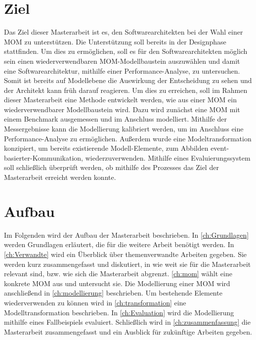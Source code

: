 \section{Ziel}
Das Ziel dieser Masterarbeit ist es, den Softwarearchitekten bei der Wahl einer MOM zu unterstützen. Die Unterstützung soll bereits in der Designphase stattfinden. Um dies zu ermöglichen, soll es für den Softwarearchitekten möglich sein einen wiederverwendbaren MOM-Modellbaustein auszuwählen und damit eine Softwarearchitektur, mithilfe einer Performance-Analyse, zu untersuchen. Somit ist bereits auf Modellebene die Auswirkung der Entscheidung zu sehen und der Architekt kann früh darauf reagieren. Um dies zu erreichen, soll im Rahmen dieser Masterarbeit eine Methode entwickelt werden, wie aus einer MOM ein wiederverwendbarer Modellbaustein wird. Dazu wird zunächst eine MOM mit einem Benchmark ausgemessen und im Anschluss modelliert. Mithilfe der Messergebnisse kann die Modellierung kalibriert werden, um im Anschluss eine Performance-Analyse zu ermöglichen. Außerdem wurde eine Modeltransformation konzipiert, um bereits existierende Modell-Elemente, zum Abbilden event-basierter-Kommunikation, wiederzuverwenden. Mithilfe eines Evaluierungssystem soll schließlich überprüft werden, ob mithilfe des Prozesses das Ziel der Masterarbeit erreicht werden konnte.

\section{Aufbau}
Im Folgenden wird der Aufbau der Masterarbeit beschrieben. In \autoref{ch:Grundlagen} werden Grundlagen erläutert, die für die weitere Arbeit benötigt werden. In \autoref{ch:Verwandte} wird ein Überblick über themenverwandte Arbeiten gegeben. Sie werden kurz zusammengefasst und diskutiert, in
wie weit sie für die Masterarbeit relevant sind, bzw. wie sich die Masterarbeit abgrenzt. \autoref{ch:mom} wählt eine konkrete MOM aus und untersucht sie. Die Modellierung einer MOM wird anschließend in \autoref{ch:modellierung} beschrieben. Um bestehende Elemente wiederverwenden zu können wird in \autoref{ch:transformation} eine Modelltransformation beschrieben. In \autoref{ch:Evaluation} wird die Modellierung mithilfe eines Fallbeispiels evaluiert. Schließlich wird in \autoref{ch:zusammenfassung} die Masterarbeit zusammengefasst und ein Ausblick für zukünftige Arbeiten gegeben.


